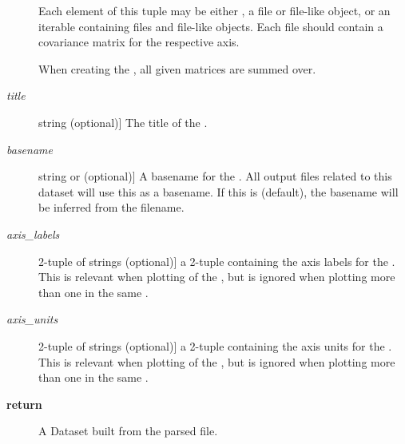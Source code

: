 \documentclass[a4paper,10pt,english]{sphinxmanual}
\begin{document}
\begin{fulllineitems}
\begin{description}
Each element of this tuple may be either , a file or file-like
object, or an iterable containing files and file-like objects. Each
file should contain a covariance matrix for the respective axis.

When creating the , all given matrices are summed over.

\item[{\emph{title}}] \leavevmode{[}string (optional){]}
The title of the .

\item[{\emph{basename}}] \leavevmode{[}string or  (optional){]}
A basename for the . All output files related to this dataset
will use this as a basename. If this is  (default), the
basename will be inferred from the filename.

\item[{\emph{axis\_labels}}] \leavevmode{[}2-tuple of strings (optional){]}
a 2-tuple containing the axis labels for the . This is
relevant when plotting  of the , but is ignored when
plotting more than one  in the same .

\item[{\emph{axis\_units}}] \leavevmode{[}2-tuple of strings (optional){]}
a 2-tuple containing the axis units for the . This is
relevant when plotting  of the , but is ignored when
plotting more than one  in the same .

\item[{\textbf{return}}] \leavevmode{[}\code{Dataset}{]}
A Dataset built from the parsed file.

\end{description}

\end{fulllineitems}

\end{document}
